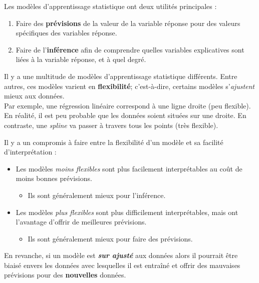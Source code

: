 \documentclass[10pt, french]{article}
\begin{document}
\begin{multicols*}{2}
Les modèles d'apprentissage statistique ont deux utilités principales : 
\begin{enumerate}[label	=	\circled{\arabic*}{lightgray}]
	\item	Faire des \textbf{prévisions} de la valeur de la variable réponse pour des valeurs spécifiques des variables réponse.
	\item	Faire de l'\textbf{inférence} afin de comprendre quelles variables explicatives sont liées à la variable réponse, et à quel degré.
\end{enumerate}

Il y a une multitude de modèles d'apprentissage statistique différents. Entre autres, ces modèles varient en \textbf{flexibilité}; c'est-à-dire, certains modèles s'\textit{ajustent} mieux aux données.\\

Par exemple, une régression linéaire correspond à une ligne droite (peu flexible). En réalité, il est peu probable que les données soient situées sur une droite. En contraste, une \og \textit{spline} \fg{} va passer à travers tous les points (très flexible).


\begin{definitionNOHFILLprop}
Il y a un compromis à faire entre la flexibilité d'un modèle et sa facilité d'interprétation :
\begin{itemize}
	\item	Les modèles \textit{moins flexibles} sont plus facilement interprétables au coût de moins bonnes prévisions. 
		\begin{itemize}
		\item	Ils sont généralement mieux pour l'inférence. 
		\end{itemize}
	\item	Les modèles \textit{plus flexibles} sont plus difficilement interprétables, mais ont l'avantage d'offrir de meilleures prévisions. 
		\begin{itemize}
		\item	Ils sont généralement mieux pour faire des prévisions.
		\end{itemize}
\end{itemize}

En revanche, si un modèle est \textit{\textbf{sur ajusté}} aux données alors il pourrait être biaisé envers les données avec lesquelles il est entraîné et offrir des mauvaises prévisions pour des \textbf{nouvelles} données.
\end{definitionNOHFILLprop}


\end{multicols*}
\end{document}
